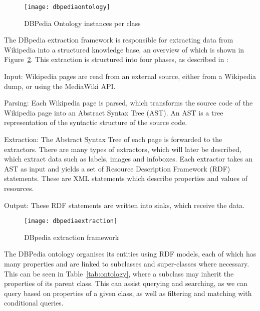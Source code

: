 \begin{figure}[h]
	\begin{center}
		\texttt{[image: dbpediaontology]}
	\end{center}
	\caption{DBPedia Ontology instances per class \cite{dbpedia2019ontology}}
	\label{fig:ontology}
\end{figure}

The DBpedia extraction framework is responsible for extracting data from Wikipedia into a structured knowledge base, an overview of which is shown in Figure~\ref{fig:extraction}. This extraction is structured into four phases, as described in \cite{lehmann2015dbpedia}:

Input: Wikipedia pages are read from an external source, either from a Wikipedia dump, or using the MediaWiki API.

Parsing: Each Wikipedia page is parsed, which transforms the source code of the Wikipedia page into an Abstract Syntax Tree (AST). An AST is a tree representation of the syntactic structure of the source code.

Extraction: The Abstract Syntax Tree of each page is forwarded to the extractors. There are many types of extractors, which will later be described, which extract data such as labels, images and infoboxes. Each extractor takes an AST as input and yields a set of Resource Description Framework (RDF) statements. These are XML statements which describe properties and values of resources.

Output: These RDF statements are written into sinks, which receive the data.

\begin{figure}[h]
	\begin{center}
		\texttt{[image: dbpediaextraction]}
	\end{center}
	\caption{DBpedia extraction framework \cite{bizer2009dbpedia}}
	\label{fig:extraction}
\end{figure}

The DBPedia ontology organises its entities using RDF models, each of which has many properties and are linked to subclasses and super-classes where necessary. This can be seen in Table~\ref{tab:ontology}, where a subclass may inherit the properties of its parent class. This can assist querying and searching, as we can query based on properties of a given class, as well as filtering and matching with conditional queries. 

